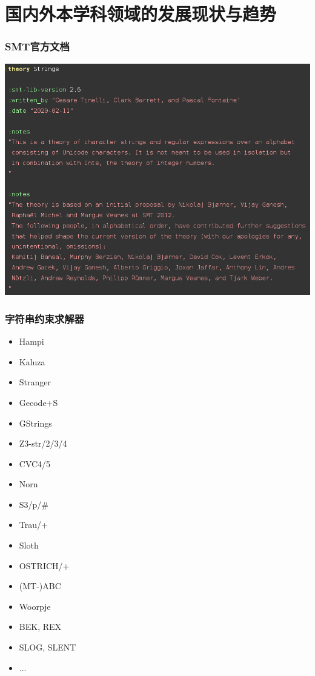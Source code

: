 \documentclass[landscape]{beamer}
\begin{document}
\section{国内外本学科领域的发展现状与趋势}
\begin{frame}[fragile, t]
  \frametitle{SMT官方文档}
  \includegraphics[width=\linewidth]{smtlib.png}
\end{frame}
\begin{frame}[fragile, t]
  \frametitle{字符串约束求解器}
  \begin{multicols}{2}
    \begin{itemize}
      \item Hampi
      \item Kaluza
      \item Stranger
      \item Gecode+S
      \item GStrings
      \item Z3-str/2/3/4
      \item CVC4/5
      \item Norn
      \item S3/p/\#
      \item Trau/+
      \item Sloth
      \item OSTRICH/+
      \item (MT-)ABC
      \item Woorpje
      \item BEK, REX
      \item SLOG, SLENT
      \item ...
    \end{itemize}
  \end{multicols}
\end{frame}
\end{document}
